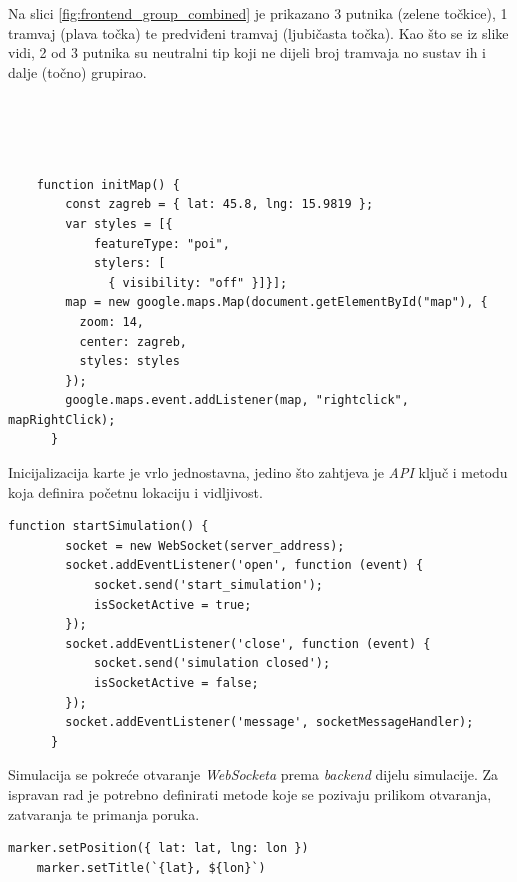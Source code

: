 \documentclass[times, utf8, diplomski]{fer}
\begin{document}
Na slici \ref{fig:frontend_group_combined} je prikazano 3 putnika (zelene točkice), 1 tramvaj (plava točka) te predviđeni tramvaj (ljubičasta točka). Kao što se iz slike vidi, 2 od 3 putnika su neutralni tip koji ne dijeli broj tramvaja no sustav ih i dalje (točno) grupirao.

\begin{lstlisting}[caption={Inicijalizacija karte},captionpos=b,label={kod:map_init}]
    

    

    function initMap() {
        const zagreb = { lat: 45.8, lng: 15.9819 };
        var styles = [{
            featureType: "poi",
            stylers: [
              { visibility: "off" }]}];
        map = new google.maps.Map(document.getElementById("map"), {
          zoom: 14,
          center: zagreb,
          styles: styles
        });
        google.maps.event.addListener(map, "rightclick", mapRightClick);
      }

\end{lstlisting}

Inicijalizacija karte je vrlo jednostavna, jedino što zahtjeva je \emph{API} ključ i metodu koja definira početnu lokaciju i vidljivost.

\begin{lstlisting}[caption={Pokretanje \emph{WebSocketa}},captionpos=b,label={kod:websocket_start}]
    function startSimulation() {
        socket = new WebSocket(server_address);
        socket.addEventListener('open', function (event) {
            socket.send('start_simulation');
            isSocketActive = true;
        });
        socket.addEventListener('close', function (event) {
            socket.send('simulation closed');
            isSocketActive = false;
        });
        socket.addEventListener('message', socketMessageHandler);
      }

\end{lstlisting}

Simulacija se pokreće otvaranje \emph{WebSocketa} prema \emph{backend} dijelu simulacije. Za ispravan rad je potrebno definirati metode koje se pozivaju prilikom otvaranja, zatvaranja te primanja poruka.

\begin{lstlisting}[caption={Osvježavanje markera},captionpos=b,label={kod:marker_update}]
    marker.setPosition({ lat: lat, lng: lon })
    marker.setTitle(`{lat}, ${lon}`)

\end{lstlisting}
\end{document}
